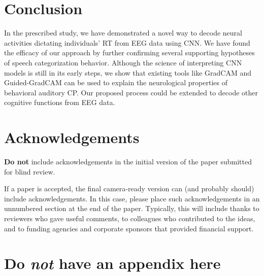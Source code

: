 \documentclass{article}
\begin{document}
\section{Conclusion}

In the prescribed study, we have demonstrated a novel way to decode neural activities dictating individuals' RT from EEG data using CNN. We have found the efficacy of our approach by further confirming several supporting hypotheses of speech categorization behavior. Although the science of interpreting CNN models is still in its early steps, we show that existing tools like GradCAM and Guided-GradCAM can be used to explain the neurological properties of behavioral auditory CP. Our proposed process could be extended to decode other cognitive functions from EEG data.
\section*{Acknowledgements}

\textbf{Do not} include acknowledgements in the initial version of
the paper submitted for blind review.

If a paper is accepted, the final camera-ready version can (and
probably should) include acknowledgements. In this case, please
place such acknowledgements in an unnumbered section at the
end of the paper. Typically, this will include thanks to reviewers
who gave useful comments, to colleagues who contributed to the ideas,
and to funding agencies and corporate sponsors that provided financial
support.


\nocite{langley00}





\appendix
\section{Do \emph{not} have an appendix here}
\end{document}
